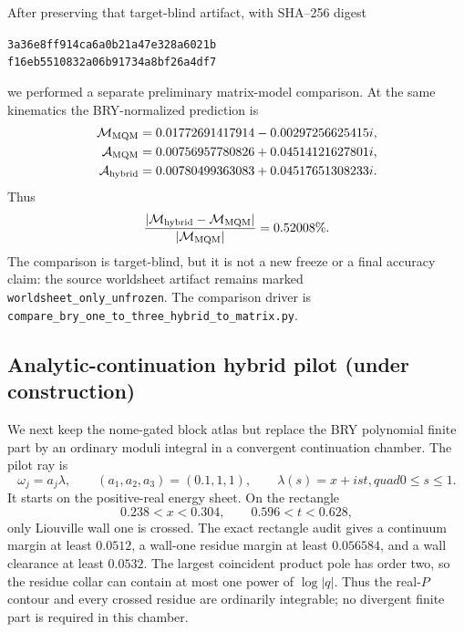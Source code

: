 \documentclass[11pt]{article}
\begin{document}
After preserving that target-blind artifact, with SHA--256 digest
\begin{center}
 \texttt{3a36e8ff914ca6a0b21a47e328a6021b}\\
 \texttt{f16eb5510832a06b91734a8bf26a4df7}
\end{center}
we performed a separate preliminary matrix-model comparison.  At the same
kinematics the BRY-normalized prediction is
\begin{align}
 \mathcal M_{\rm MQM}
  &=0.01772691417914-0.00297256625415i,
 \notag\\
 \mathcal A_{\rm MQM}
  &=0.00756957780826+0.04514121627801i,
 \notag\\
 \mathcal A_{\rm hybrid}
  &=0.00780499363083+0.04517651308233i.
 \label{eq:bry-hybrid-preliminary-mqm-comparison}
\end{align}
Thus
\begin{equation}
 \frac{|\mathcal M_{\rm hybrid}-\mathcal M_{\rm MQM}|}
 {|\mathcal M_{\rm MQM}|}
 =0.52008\%.
 \label{eq:bry-hybrid-preliminary-relative-difference}
\end{equation}
The comparison is target-blind, but it is not a new freeze or a final
accuracy claim: the source worldsheet artifact remains marked
\texttt{worldsheet\_only\_unfrozen}.  The comparison driver is
\texttt{compare\_bry\_one\_to\_three\_hybrid\_to\_matrix.py}.

\subsection{Analytic-continuation hybrid pilot (under construction)}

We next keep the nome-gated block atlas but replace the BRY polynomial
finite part by an ordinary moduli integral in a convergent continuation
chamber.  The pilot ray is
\begin{equation}
 \omega_j=a_j\lambda,
 \qquad
 (a_1,a_2,a_3)=(0.1,1,1),
 \qquad
 \lambda(s)=x+ist,quad 0\leq s\leq1.
 \label{eq:type0b-analytic-hybrid-ray}
\end{equation}
It starts on the positive-real energy sheet.  On the rectangle
\begin{equation}
 0.238<x<0.304,
 \qquad
 0.596<t<0.628,
 \label{eq:type0b-analytic-hybrid-rectangle}
\end{equation}
only Liouville wall one is crossed.  The exact rectangle audit gives a
continuum margin at least $0.0512$, a wall-one residue margin at least
$0.056584$, and a wall clearance at least $0.0532$.  The largest coincident
product pole has order two, so the residue collar can contain at most one
power of $\log|q|$.  Thus the real-$P$ contour and every crossed residue are
ordinarily integrable; no divergent finite part is required in this chamber.
\end{document}
